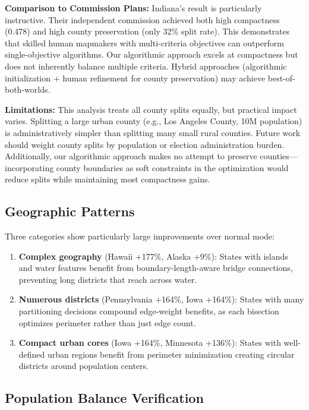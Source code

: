 \textbf{Comparison to Commission Plans:} Indiana's result is particularly instructive. Their independent commission achieved both high compactness (0.478) and high county preservation (only 32\% split rate). This demonstrates that skilled human mapmakers with multi-criteria objectives can outperform single-objective algorithms. Our algorithmic approach excels at compactness but does not inherently balance multiple criteria. Hybrid approaches (algorithmic initialization + human refinement for county preservation) may achieve best-of-both-worlds.

\textbf{Limitations:} This analysis treats all county splits equally, but practical impact varies. Splitting a large urban county (e.g., Los Angeles County, 10M population) is administratively simpler than splitting many small rural counties. Future work should weight county splits by population or election administration burden. Additionally, our algorithmic approach makes no attempt to preserve counties—incorporating county boundaries as soft constraints in the optimization would reduce splits while maintaining most compactness gains.

\subsection{Geographic Patterns}

Three categories show particularly large improvements over normal mode:

\begin{enumerate}
    \item \textbf{Complex geography} (Hawaii +177\%, Alaska +9\%): States with islands and water features benefit from boundary-length-aware bridge connections, preventing long districts that reach across water.

    \item \textbf{Numerous districts} (Pennsylvania +164\%, Iowa +164\%): States with many partitioning decisions compound edge-weight benefits, as each bisection optimizes perimeter rather than just edge count.

    \item \textbf{Compact urban cores} (Iowa +164\%, Minnesota +136\%): States with well-defined urban regions benefit from perimeter minimization creating circular districts around population centers.
\end{enumerate}

\subsection{Population Balance Verification}

